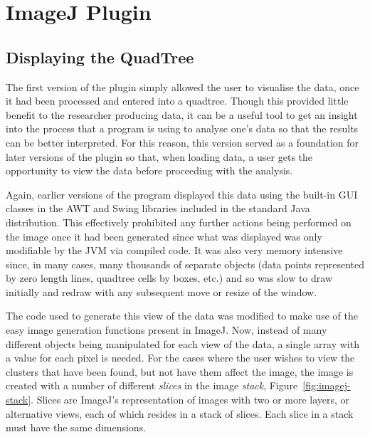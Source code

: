 
\section{ImageJ Plugin}
\label{sec:imagej_plugin}

\cite{imagejapi}

\subsection{Displaying the QuadTree}
\label{sub:displaying_the_quadtree}

The first version of the plugin simply allowed the user to visualise the data,
once it had been processed and entered into a quadtree. Though this provided
little benefit to the researcher producing data, it can be a useful tool to get
an insight into the process that a program is using to analyse one's data so
that the results can be better interpreted. For this reason, this version
served as a foundation for later versions of the plugin so that, when loading
data, a user gets the opportunity to view the data before proceeding with the
analysis.

Again, earlier versions of the program displayed this data using the built-in
GUI classes in the AWT\cite{zukowski1997java} and Swing\cite{loy2002java}
libraries included in the standard Java distribution. This effectively
prohibited any further actions being performed on the image once it had been
generated since what was displayed was only modifiable by the JVM via compiled
code. It was also very memory intensive since, in many cases, many thousands of
separate objects (data points represented by zero length lines, quadtree cells
by boxes, etc.) and so was slow to draw initially and redraw with any
subsequent move or resize of the window.

The code used to generate this view of the data was modified to make use of the
easy image generation functions present in ImageJ. Now, instead of many
different objects being manipulated for each view of the data, a single array
with a value for each pixel is needed. For the cases where the user wishes to
view the clusters that have been found, but not have them affect the image, the
image is created with a number of different \emph{slices} in the image
\emph{stack}, Figure~\ref{fig:imagej-stack}. Slices are ImageJ's representation
of images with two or more layers, or alternative views, each of which resides
in a stack of slices. Each slice in a stack must have the same dimensions.

